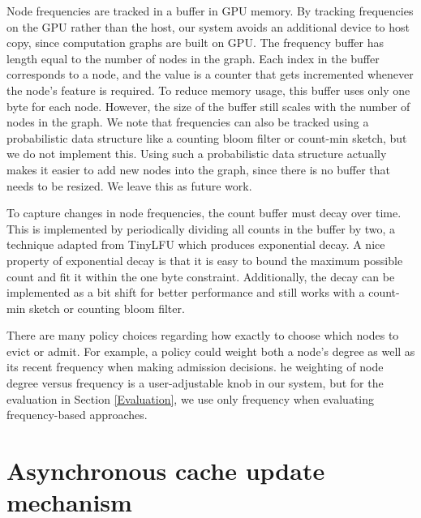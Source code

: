 Node frequencies are tracked in a buffer in GPU memory. By tracking frequencies on the GPU rather than the host, our system avoids an additional device to host copy, since computation graphs are built on GPU. The frequency buffer has length equal to the number of nodes in the graph.
Each index in the buffer corresponds to a node, and the value is a counter that gets incremented whenever the node's feature is required.
To reduce memory usage, this buffer uses only one byte for each node. 
However, the size of the buffer still scales with the number of nodes in the graph. We note that frequencies can also be tracked using a probabilistic data structure like a counting bloom filter or count-min sketch, but we do not implement this.
Using such a probabilistic data structure actually makes it easier to add new nodes into the graph, since there is no buffer that needs to be resized.
We leave this as future work.

To capture changes in node frequencies, the count buffer must decay over time.
This is implemented by periodically dividing all counts in the buffer by two, a technique adapted from TinyLFU \cite{TinyLFU_2014} which produces exponential decay.
A nice property of exponential decay is that it is easy to bound the maximum possible count and fit it within the one byte constraint. 
Additionally, the decay can be implemented as a bit shift for better performance and still works with a count-min sketch or counting bloom filter.

There are many policy choices regarding how exactly to choose which nodes to evict or admit. 
For example, a policy could weight both a node's degree as well as its recent frequency when making admission decisions. 
he weighting of node degree versus frequency is a user-adjustable knob in our system, but for the evaluation in Section \ref{Evaluation}, we use only frequency when evaluating frequency-based approaches.

\section{Asynchronous cache update mechanism} \label{Implementation: Async Update}

